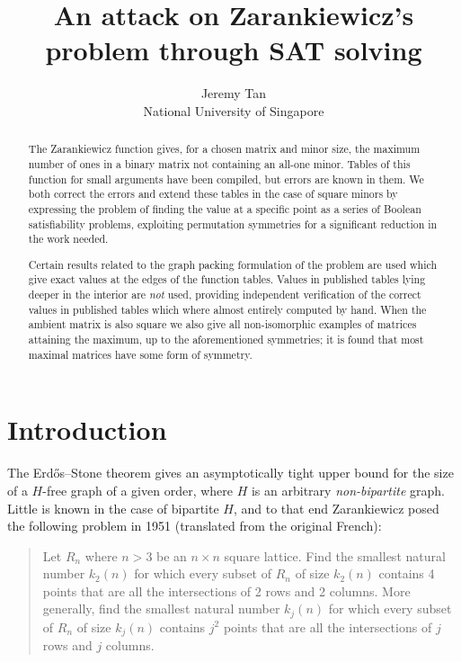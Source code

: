 \documentclass[10pt,a4paper]{article}
\title{An attack on Zarankiewicz's problem through SAT solving}
\author{Jeremy Tan\\National University of Singapore}
\theoremstyle{definition}
\begin{document}
	
	\maketitle
	
	\begin{abstract}
		The Zarankiewicz function gives, for a chosen matrix and minor size, the maximum number of ones in a binary matrix not containing an all-one minor. Tables of this function for small arguments have been compiled, but errors are known in them. We both correct the errors and extend these tables in the case of square minors by expressing the problem of finding the value at a specific point as a series of Boolean satisfiability problems, exploiting permutation symmetries for a significant reduction in the work needed.
		
		Certain results related to the graph packing formulation of the problem are used which give exact values at the edges of the function tables. Values in published tables lying deeper in the interior are \textit{not} used, providing independent verification of the correct values in published tables which where almost entirely computed by hand. When the ambient matrix is also square we also give all non-isomorphic examples of matrices attaining the maximum, up to the aforementioned symmetries; it is found that most maximal matrices have some form of symmetry.
	\end{abstract}
	
	\section{Introduction}
	
	The Erdős--Stone theorem \cite{erdosstone} gives an asymptotically tight upper bound for the size of a $H$-free graph of a given order, where $H$ is an arbitrary \textit{non-bipartite} graph. Little is known in the case of bipartite $H$, and to that end Zarankiewicz \cite{origin} posed the following problem in 1951 (translated from the original French):
	
	\begin{quotation}
		Let $R_n$ where $n>3$ be an $n\times n$ square lattice. Find the smallest natural number $k_2(n)$ for which every subset of $R_n$ of size $k_2(n)$ contains 4 points that are all the intersections of 2 rows and 2 columns. More generally, find the smallest natural number $k_j(n)$ for which every subset of $R_n$ of size $k_j(n)$ contains $j^2$ points that are all the intersections of $j$ rows and $j$ columns.
	\end{quotation}
	
\end{document}

